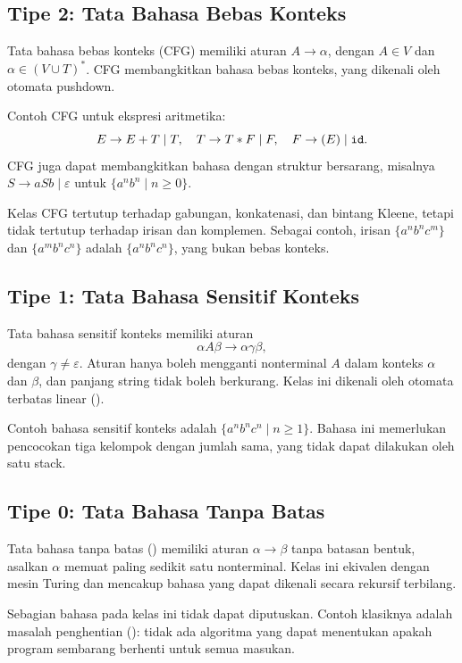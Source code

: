 \subsection{Tipe 2: Tata Bahasa Bebas Konteks}

Tata bahasa bebas konteks (CFG) memiliki aturan \(A \to \alpha\),
dengan \(A \in V\) dan \(\alpha \in (V \cup T)^{*}\). CFG
membangkitkan bahasa bebas konteks, yang dikenali oleh otomata
pushdown.

Contoh CFG untuk ekspresi aritmetika:
\[
E \to E + T \mid T, \quad
T \to T * F \mid F, \quad
F \to (E) \mid \texttt{id}.
\]
CFG juga dapat membangkitkan bahasa dengan struktur bersarang,
misalnya \(S \to aSb \mid \varepsilon\) untuk
\(\{a^n b^n \mid n \ge 0\}\).

Kelas CFG tertutup terhadap gabungan, konkatenasi, dan bintang
Kleene, tetapi tidak tertutup terhadap irisan dan komplemen. Sebagai
contoh, irisan \(\{a^n b^n c^m\}\) dan \(\{a^m b^n c^n\}\) adalah
\(\{a^n b^n c^n\}\), yang bukan bebas konteks.

\subsection{Tipe 1: Tata Bahasa Sensitif Konteks}

Tata bahasa sensitif konteks memiliki aturan
\[
\alpha A \beta \to \alpha \gamma \beta,
\]
dengan \(\gamma \neq \varepsilon\). Aturan hanya boleh mengganti
nonterminal \(A\) dalam konteks \(\alpha\) dan \(\beta\), dan panjang
string tidak boleh berkurang. Kelas ini dikenali oleh otomata
terbatas linear ().

Contoh bahasa sensitif konteks adalah
\(\{a^n b^n c^n \mid n \ge 1\}\). Bahasa ini memerlukan pencocokan
tiga kelompok dengan jumlah sama, yang tidak dapat dilakukan oleh
satu stack.

\subsection{Tipe 0: Tata Bahasa Tanpa Batas}

Tata bahasa tanpa batas () memiliki aturan
\(\alpha \to \beta\) tanpa batasan bentuk, asalkan \(\alpha\) memuat
paling sedikit satu nonterminal. Kelas ini ekivalen dengan mesin
Turing dan mencakup bahasa yang dapat dikenali secara rekursif
terbilang.

Sebagian bahasa pada kelas ini tidak dapat diputuskan. Contoh
klasiknya adalah masalah penghentian (): tidak
ada algoritma yang dapat menentukan apakah program sembarang berhenti
untuk semua masukan.

